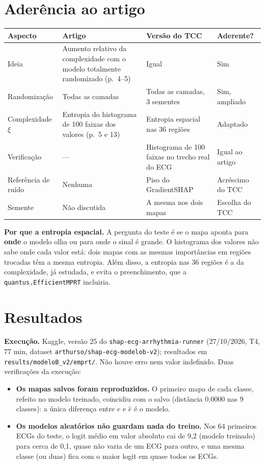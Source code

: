 \documentclass[11pt,a4paper]{article}
\begin{document}
\section{Aderência ao artigo}\label{sec:aderencia}
\begin{center}\small
\begin{tabularx}{\linewidth}{lXXl}
\toprule
\textbf{Aspecto} & \textbf{Artigo} & \textbf{Versão do TCC} & \textbf{Aderente?} \\
\midrule
Ideia & Aumento relativo da complexidade com o modelo totalmente randomizado (p.~4--5) & Igual & Sim \\ \addlinespace
Randomização & Todas as camadas & Todas as camadas, 3 sementes & Sim, ampliado \\ \addlinespace
Complexidade $\xi$ & Entropia do histograma de 100 faixas dos valores (p.~5 e 13) & Entropia espacial nas 36 regiões & Adaptado \\ \addlinespace
Verificação & --- & Histograma de 100 faixas no trecho real do ECG & Igual ao artigo \\ \addlinespace
Referência de ruído & Nenhuma & Piso do GradientSHAP & Acréscimo do TCC \\ \addlinespace
Semente & Não discutida & A mesma nos dois mapas & Escolha do TCC \\
\bottomrule
\end{tabularx}
\end{center}

\textbf{Por que a entropia espacial.} A pergunta do teste é se o mapa aponta para \textbf{onde} o modelo olha ou para onde o sinal é grande. O histograma dos valores não sabe onde cada valor está: dois mapas com as mesmas importâncias em regiões trocadas têm a mesma entropia. Além disso, a entropia nas 36 regiões é a da complexidade, já estudada, e evita o preenchimento, que a \texttt{quantus.EfficientMPRT} incluiria.

\section{Resultados}\label{sec:resultados}
\textbf{Execução.} Kaggle, versão 25 do \texttt{shap-ecg-arrhythmia-runner} (27/10/2026, T4, 77 min, dataset \texttt{arthurso/shap-ecg-modelob-v2}); resultados em \texttt{results/modeloB\_v2/emprt/}. Não houve erro nem valor indefinido. Duas verificações da execução:
\begin{itemize}
\item \textbf{Os mapas salvos foram reproduzidos.} O primeiro mapa de cada classe, refeito no modelo treinado, coincidiu com o salvo (distância 0,0000 nas 9 classes): a única diferença entre $e$ e $\hat{e}$ é o modelo.
\item \textbf{Os modelos aleatórios não guardam nada do treino.} Nos 64 primeiros ECGs do teste, o logit médio em valor absoluto cai de 9,2 (modelo treinado) para cerca de 0,1, quase não varia de um ECG para outro, e uma mesma classe (ou duas) fica com o maior logit em quase todos os ECGs.
\end{itemize}
\end{document}
